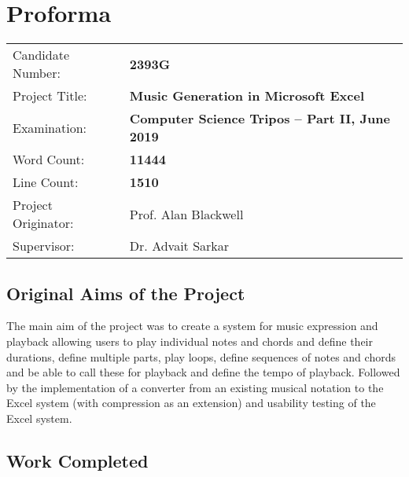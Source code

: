 \chapter*{Proforma}

{\large
\begin{tabular}{ll}
Candidate Number:   & \bf 2393G                                \\
Project Title:      & \bf Music Generation in Microsoft Excel \\
Examination:        & \bf Computer Science Tripos -- Part II, June 2019  \\
Word Count:         & \bf 11444\footnotemark[1]  \\
Line Count:         & \bf 1510\footnotemark[2]  \\
Project Originator: & Prof. Alan Blackwell                    \\
Supervisor:         & Dr. Advait Sarkar                    \\
\end{tabular}
}


\section*{Original Aims of the Project}

The main aim of the project was to create a system for music expression and playback allowing users to play individual notes and chords and define their durations, define multiple parts, play loops, define sequences of notes and chords and be able to call these for playback and define the tempo of playback. Followed by the implementation of a converter from an existing musical notation to the Excel system (with compression as an extension) and usability testing of the Excel system.

\section*{Work Completed}

